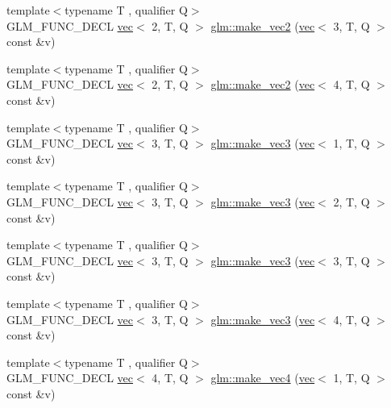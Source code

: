 \begin{DoxyCompactItemize}
\item 
{\footnotesize template$<$typename T , qualifier Q$>$ }\\G\+L\+M\+\_\+\+F\+U\+N\+C\+\_\+\+D\+E\+CL \hyperlink{structglm_1_1vec}{vec}$<$ 2, T, Q $>$ \hyperlink{group__gtc__type__ptr_ga0084fea4694cf47276e9cccbe7b1015a}{glm\+::make\+\_\+vec2} (\hyperlink{structglm_1_1vec}{vec}$<$ 3, T, Q $>$ const \&v)
\item 
{\footnotesize template$<$typename T , qualifier Q$>$ }\\G\+L\+M\+\_\+\+F\+U\+N\+C\+\_\+\+D\+E\+CL \hyperlink{structglm_1_1vec}{vec}$<$ 2, T, Q $>$ \hyperlink{group__gtc__type__ptr_ga2b81f71f3a222fe5bba81e3983751249}{glm\+::make\+\_\+vec2} (\hyperlink{structglm_1_1vec}{vec}$<$ 4, T, Q $>$ const \&v)
\item 
{\footnotesize template$<$typename T , qualifier Q$>$ }\\G\+L\+M\+\_\+\+F\+U\+N\+C\+\_\+\+D\+E\+CL \hyperlink{structglm_1_1vec}{vec}$<$ 3, T, Q $>$ \hyperlink{group__gtc__type__ptr_ga9147e4b3a5d0f4772edfbfd179d7ea0b}{glm\+::make\+\_\+vec3} (\hyperlink{structglm_1_1vec}{vec}$<$ 1, T, Q $>$ const \&v)
\item 
{\footnotesize template$<$typename T , qualifier Q$>$ }\\G\+L\+M\+\_\+\+F\+U\+N\+C\+\_\+\+D\+E\+CL \hyperlink{structglm_1_1vec}{vec}$<$ 3, T, Q $>$ \hyperlink{group__gtc__type__ptr_ga482b60a842a5b154d3eed392417a9511}{glm\+::make\+\_\+vec3} (\hyperlink{structglm_1_1vec}{vec}$<$ 2, T, Q $>$ const \&v)
\item 
{\footnotesize template$<$typename T , qualifier Q$>$ }\\G\+L\+M\+\_\+\+F\+U\+N\+C\+\_\+\+D\+E\+CL \hyperlink{structglm_1_1vec}{vec}$<$ 3, T, Q $>$ \hyperlink{group__gtc__type__ptr_gacd57046034df557b8b1c457f58613623}{glm\+::make\+\_\+vec3} (\hyperlink{structglm_1_1vec}{vec}$<$ 3, T, Q $>$ const \&v)
\item 
{\footnotesize template$<$typename T , qualifier Q$>$ }\\G\+L\+M\+\_\+\+F\+U\+N\+C\+\_\+\+D\+E\+CL \hyperlink{structglm_1_1vec}{vec}$<$ 3, T, Q $>$ \hyperlink{group__gtc__type__ptr_ga8b589ed7d41a298b516d2a69169248f1}{glm\+::make\+\_\+vec3} (\hyperlink{structglm_1_1vec}{vec}$<$ 4, T, Q $>$ const \&v)
\item 
{\footnotesize template$<$typename T , qualifier Q$>$ }\\G\+L\+M\+\_\+\+F\+U\+N\+C\+\_\+\+D\+E\+CL \hyperlink{structglm_1_1vec}{vec}$<$ 4, T, Q $>$ \hyperlink{group__gtc__type__ptr_ga600cb97f70c5d50d3a4a145e1cafbf37}{glm\+::make\+\_\+vec4} (\hyperlink{structglm_1_1vec}{vec}$<$ 1, T, Q $>$ const \&v)

\end{DoxyCompactItemize}
